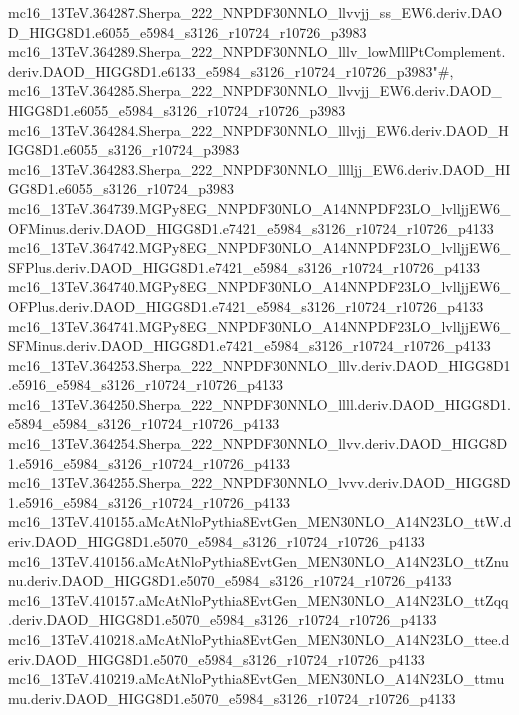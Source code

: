 mc16_13TeV.364287.Sherpa_222_NNPDF30NNLO_llvvjj_ss_EW6.deriv.DAOD_HIGG8D1.e6055_e5984_s3126_r10724_r10726_p3983
mc16_13TeV.364289.Sherpa_222_NNPDF30NNLO_lllv_lowMllPtComplement.deriv.DAOD_HIGG8D1.e6133_e5984_s3126_r10724_r10726_p3983"#,
mc16_13TeV.364285.Sherpa_222_NNPDF30NNLO_llvvjj_EW6.deriv.DAOD_HIGG8D1.e6055_e5984_s3126_r10724_r10726_p3983
mc16_13TeV.364284.Sherpa_222_NNPDF30NNLO_lllvjj_EW6.deriv.DAOD_HIGG8D1.e6055_s3126_r10724_p3983
mc16_13TeV.364283.Sherpa_222_NNPDF30NNLO_lllljj_EW6.deriv.DAOD_HIGG8D1.e6055_s3126_r10724_p3983
mc16_13TeV.364739.MGPy8EG_NNPDF30NLO_A14NNPDF23LO_lvlljjEW6_OFMinus.deriv.DAOD_HIGG8D1.e7421_e5984_s3126_r10724_r10726_p4133 \\
mc16_13TeV.364742.MGPy8EG_NNPDF30NLO_A14NNPDF23LO_lvlljjEW6_SFPlus.deriv.DAOD_HIGG8D1.e7421_e5984_s3126_r10724_r10726_p4133 \\
mc16_13TeV.364740.MGPy8EG_NNPDF30NLO_A14NNPDF23LO_lvlljjEW6_OFPlus.deriv.DAOD_HIGG8D1.e7421_e5984_s3126_r10724_r10726_p4133 \\
mc16_13TeV.364741.MGPy8EG_NNPDF30NLO_A14NNPDF23LO_lvlljjEW6_SFMinus.deriv.DAOD_HIGG8D1.e7421_e5984_s3126_r10724_r10726_p4133 \\
mc16_13TeV.364253.Sherpa_222_NNPDF30NNLO_lllv.deriv.DAOD_HIGG8D1.e5916_e5984_s3126_r10724_r10726_p4133 \\
mc16_13TeV.364250.Sherpa_222_NNPDF30NNLO_llll.deriv.DAOD_HIGG8D1.e5894_e5984_s3126_r10724_r10726_p4133 \\
mc16_13TeV.364254.Sherpa_222_NNPDF30NNLO_llvv.deriv.DAOD_HIGG8D1.e5916_e5984_s3126_r10724_r10726_p4133 \\
mc16_13TeV.364255.Sherpa_222_NNPDF30NNLO_lvvv.deriv.DAOD_HIGG8D1.e5916_e5984_s3126_r10724_r10726_p4133 \\
mc16_13TeV.410155.aMcAtNloPythia8EvtGen_MEN30NLO_A14N23LO_ttW.deriv.DAOD_HIGG8D1.e5070_e5984_s3126_r10724_r10726_p4133 \\
mc16_13TeV.410156.aMcAtNloPythia8EvtGen_MEN30NLO_A14N23LO_ttZnunu.deriv.DAOD_HIGG8D1.e5070_e5984_s3126_r10724_r10726_p4133 \\
mc16_13TeV.410157.aMcAtNloPythia8EvtGen_MEN30NLO_A14N23LO_ttZqq.deriv.DAOD_HIGG8D1.e5070_e5984_s3126_r10724_r10726_p4133 \\
mc16_13TeV.410218.aMcAtNloPythia8EvtGen_MEN30NLO_A14N23LO_ttee.deriv.DAOD_HIGG8D1.e5070_e5984_s3126_r10724_r10726_p4133 \\
mc16_13TeV.410219.aMcAtNloPythia8EvtGen_MEN30NLO_A14N23LO_ttmumu.deriv.DAOD_HIGG8D1.e5070_e5984_s3126_r10724_r10726_p4133 \\

